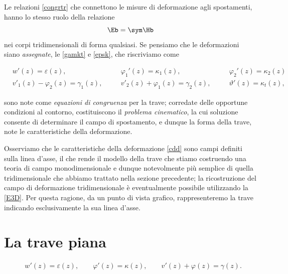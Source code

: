 Le relazioni  \eqref{congrtr} che  connettono le misure di deformazione agli spostamenti,  hanno lo stesso ruolo della relazione
\begin{equation}
	\Eb = \sym \Hb
\end{equation}
nei corpi tridimensionali di forma qualsiasi. Se pensiamo  che le deformazioni siano \textit{assegnate}, le \eqref{gamkt}  e \eqref{epsk}, che riscriviamo come 
\begin{definition}
	\begin{equation}\label{congr}
	\begin{aligned}
&w'(z)=\varepsilon(z), \quad &&\varphi_1'(z)=\kappa_1(z), \quad  && \varphi_2'(z)=\kappa_2(z) \\
&  v'_1(z)-\varphi_2(z)=\gamma_1(z), \quad && v'_2(z)+\varphi_1(z)=\gamma_2(z), \quad&& \vartheta'(z)=\kappa_t(z),
\end{aligned}
\end{equation}
\end{definition}
sono note come \textit{equazioni di congruenza} per la trave; corredate delle opportune condizioni al contorno, costituiscono il \textit{problema cinematico}, la cui soluzione consente di determinare il campo di spostamento, e dunque la forma della trave, note le caratteristiche della deformazione.

Osserviamo che le caratteristiche della deformazione \eqref{cdd} sono campi definiti sulla linea d'asse, il che rende il modello della trave che stiamo costruendo una teoria di campo monodimensionale e dunque notevolmente più semplice di quella tridimensionale che abbiamo trattato nella sezione precedente; la ricostruzione del campo di deformazione tridimensionale è eventualmente possibile utilizzando la \eqref{E3D}.  Per questa ragione, da un punto di vista grafico, rappresenteremo la trave indicando esclusivamente la sua linea d'asse.



\section{La trave piana}
\lipsum[1]
\begin{definition}
	\begin{equation}\label{congrpiana}
		\begin{aligned}
			&w'(z)=\varepsilon(z), \qquad \varphi'(z)=\kappa(z), \qquad  v'(z)+\varphi(z)=\gamma(z).
		\end{aligned}
	\end{equation}
\end{definition}




